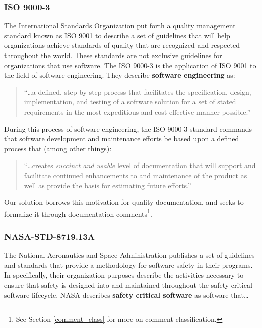 \subsubsection{ISO 9000-3}
The International Standards Organization put forth a quality management standard
known as ISO 9001 to describe a set of guidelines that will help organizations
achieve standards of quality that are recognized and respected throughout the
world. These standards are not exclusive guidelines for organizations that use
software. The ISO 9000-3 is the application of ISO 9001 to the field of software
engineering. They describe \textbf{software engineering} as: 

\begin{quote}
``\ldots a defined, step-by-step process that facilitates the specification,
design, implementation, and testing of a software solution for a set of stated
requirements in the most expeditious and cost-effective manner possible.''
\cite{Kehoe1996}
\end{quote}

During this process of software engineering, the ISO 9000-3 standard commands
that software development and maintenance efforts be based upon a defined
process that (among other things): 

\begin{quote}
``\ldots creates \textit{succinct and usable} level of documentation that will
support and facilitate continued enhancements to and maintenance of the product
as well as provide the basis for estimating future efforts.'' \cite{Kehoe1996}
\end{quote}

Our solution borrows this motivation for quality documentation, and seeks to
formalize it through documentation comments\footnote{See Section
\ref{comment_class} for more on comment classification.}.

\subsubsection{NASA-STD-8719.13A}
The National Aeronautics and Space Administration publishes a set of guidelines
and standards that provide a methodology for software safety in their programs.
In \cite{NASA1997} specifically, their organization purposes describe the
activities necessary to ensure that safety is designed into and maintained
throughout the safety critical software lifecycle. NASA describes \textbf{safety
critical software} as software that\ldots


